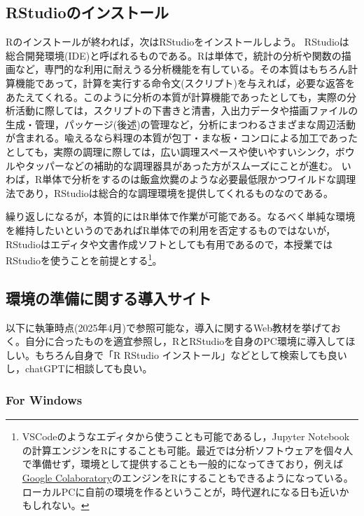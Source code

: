 \documentclass[
  a4paper,
]{ltjsbook}
\begin{document}
\subsection{RStudioのインストール}\label{rstudioux306eux30a4ux30f3ux30b9ux30c8ux30fcux30eb}

Rのインストールが終われば，次はRStudioをインストールしよう。
RStudioは総合開発環境(IDE)と呼ばれるものである。Rは単体で，統計の分析や関数の描画など，専門的な利用に耐えうる分析機能を有している。その本質はもちろん計算機能であって，計算を実行する命令文(スクリプト)を与えれば，必要な返答をあたえてくれる。このように分析の本質が計算機能であったとしても，実際の分析活動に際しては，スクリプトの下書きと清書，入出力データや描画ファイルの生成・管理，パッケージ(後述)の管理など，分析にまつわるさまざまな周辺活動が含まれる。喩えるなら料理の本質が包丁・まな板・コンロによる加工であったとしても，実際の調理に際しては，広い調理スペースや使いやすいシンク，ボウルやタッパーなどの補助的な調理器具があった方がスムーズにことが進む。
いわば，R単体で分析をするのは飯盒炊爨のような必要最低限かつワイルドな調理法であり，RStudioは総合的な調理環境を提供してくれるものなのである。

繰り返しになるが，本質的にはR単体で作業が可能である。なるべく単純な環境を維持したいというのであればR単体での利用を否定するものではないが，RStudioはエディタや文書作成ソフトとしても有用であるので，本授業ではRStudioを使うことを前提とする\footnote{VSCodeのようなエディタから使うことも可能であるし，Jupyter
  Notebookの計算エンジンをRにすることも可能。最近では分析ソフトウェアを個々人で準備せず，環境として提供することも一般的になってきており，例えば\href{https://colab.research.google.com/}{Google
  Colaboratory}のエンジンをRにすることもできるようになっている。ローカルPCに自前の環境を作るということが，時代遅れになる日も近いかもしれない。}。

\subsection{環境の準備に関する導入サイト}\label{ux74b0ux5883ux306eux6e96ux5099ux306bux95a2ux3059ux308bux5c0eux5165ux30b5ux30a4ux30c8}

以下に執筆時点(2025年4月)で参照可能な，導入に関するWeb教材を挙げておく。自分に合ったものを適宜参照し，RとRStudioを自身のPC環境に導入してほしい。もちろん自身で「R
RStudio
インストール」などとして検索しても良いし，chatGPTに相談しても良い。

\subsubsection{For Windows}\label{for-windows}
\end{document}

